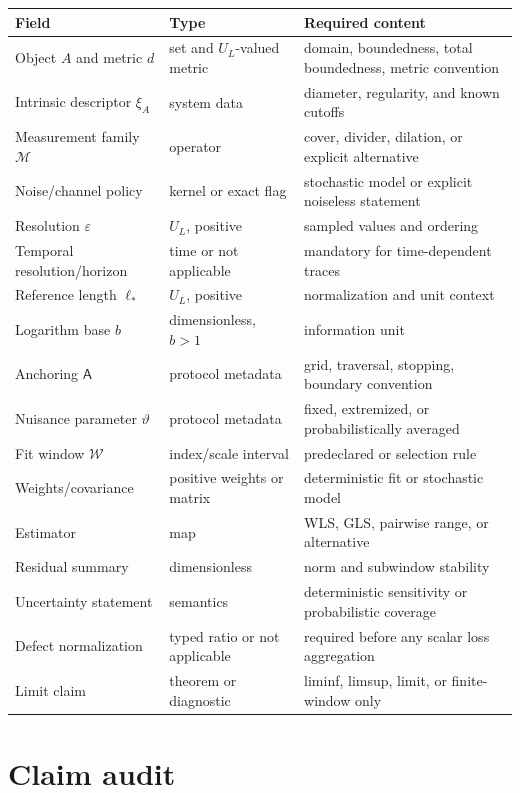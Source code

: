 \documentclass[11pt,a4paper]{article}
\theoremstyle{definition}
\theoremstyle{plain}
\theoremstyle{remark}
\newcommand{\Mcal}{\mathcal{M}}
\newcommand{\Wcal}{\mathcal{W}}
\begin{document}
\begin{longtable}{L{0.23\textwidth}L{0.20\textwidth}L{0.47\textwidth}}
\toprule
Field & Type & Required content\\
\midrule
\endhead
Object $A$ and metric $d$ & set and $U_L$-valued metric & domain,
boundedness, total boundedness, metric convention\\
Intrinsic descriptor $\xi_A$ & system data & diameter, regularity, and
known cutoffs\\
Measurement family $\Mcal$ & operator & cover, divider, dilation, or
explicit alternative\\
Noise/channel policy & kernel or exact flag & stochastic model or
explicit noiseless statement\\
Resolution $\varepsilon$ & $U_L$, positive & sampled values and ordering\\
Temporal resolution/horizon & time or not applicable & mandatory for
time-dependent traces\\
Reference length $\ell_*$ & $U_L$, positive & normalization and unit
context\\
Logarithm base $b$ & dimensionless, $b>1$ & information unit\\
Anchoring $\mathsf A$ & protocol metadata & grid, traversal, stopping,
boundary convention\\
Nuisance parameter $\vartheta$ & protocol metadata & fixed, extremized, or
probabilistically averaged\\
Fit window $\Wcal$ & index/scale interval & predeclared or selection rule\\
Weights/covariance & positive weights or matrix & deterministic fit or
stochastic model\\
Estimator & map & WLS, GLS, pairwise range, or alternative\\
Residual summary & dimensionless & norm and subwindow stability\\
Uncertainty statement & semantics & deterministic sensitivity or
probabilistic coverage\\
Defect normalization & typed ratio or not applicable & required before
any scalar loss aggregation\\
Limit claim & theorem or diagnostic & liminf, limsup, limit, or finite-window
only\\
\bottomrule
\end{longtable}

\section{Claim audit}
\end{document}
